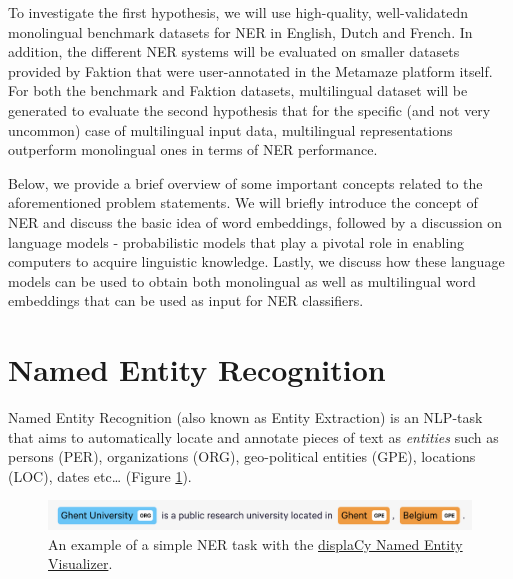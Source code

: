 \documentclass[12pt,a4paper,]{book}
\begin{document}
To investigate the first hypothesis, we will use high-quality, well-validatedn monolingual benchmark datasets for NER in English, Dutch and French. In addition, the different NER systems will be evaluated on smaller datasets provided by Faktion that were user-annotated in the Metamaze platform itself. For both the benchmark and Faktion datasets, multilingual dataset will be generated to evaluate the second hypothesis that for the specific (and not very uncommon) case of multilingual input data, multilingual representations outperform monolingual ones in terms of NER performance.

Below, we provide a brief overview of some important concepts related to the aforementioned problem statements. We will briefly introduce the concept of NER and discuss the basic idea of word embeddings, followed by a discussion on language models - probabilistic models that play a pivotal role in enabling computers to acquire linguistic knowledge. Lastly, we discuss how these language models can be used to obtain both monolingual as well as multilingual word embeddings that can be used as input for NER classifiers.

\hypertarget{named-entity-recognition}{%
\section{Named Entity Recognition}\label{named-entity-recognition}}

Named Entity Recognition (also known as Entity Extraction) is an NLP-task that aims to automatically locate and annotate pieces of text as \emph{entities} such as persons (PER), organizations (ORG), geo-political entities (GPE), locations (LOC), dates etc\ldots{} (Figure \ref{fig:ner-example}).

\begin{figure}

{\centering \includegraphics[width=1\linewidth]{images/ner_example} 

}

\caption{An example of a simple NER task with the \href{https://explosion.ai/demos/displacy-ent}{displaCy Named Entity Visualizer}.}\label{fig:ner-example}
\end{figure}
\end{document}
